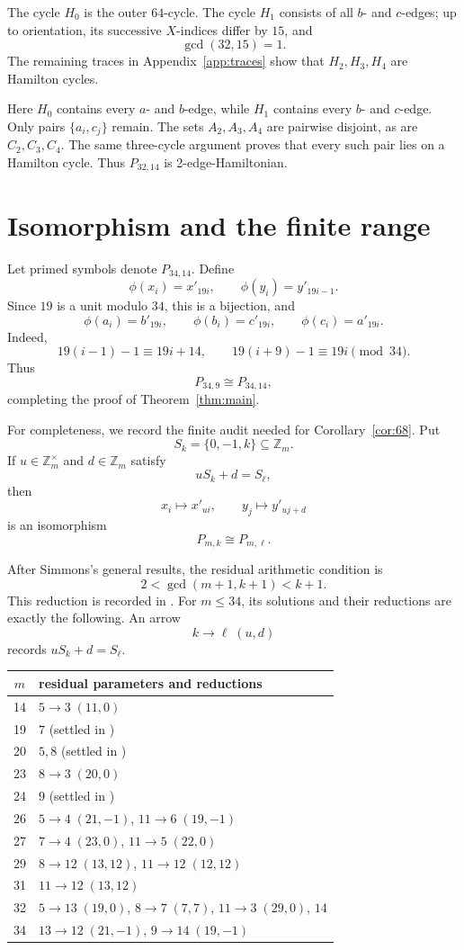 \documentclass[11pt]{amsart}
\newcommand{\Z}{\mathbb Z}
\begin{document}
The cycle $H_0$ is the outer $64$-cycle. The cycle $H_1$ consists of all
$b$- and $c$-edges; up to orientation, its successive $X$-indices differ
by $15$, and
\[
 \gcd(32,15)=1.
\]
The remaining traces in Appendix~\ref{app:traces} show that
$H_2,H_3,H_4$ are Hamilton cycles.

Here $H_0$ contains every $a$- and $b$-edge, while $H_1$ contains every
$b$- and $c$-edge. Only pairs $\{a_i,c_j\}$ remain. The sets
$A_2,A_3,A_4$ are pairwise disjoint, as are $C_2,C_3,C_4$. The same
three-cycle argument proves that every such pair lies on a Hamilton cycle.
Thus $P_{32,14}$ is 2-edge-Hamiltonian.

\section{Isomorphism and the finite range}

Let primed symbols denote $P_{34,14}$. Define
\[
 \phi(x_i)=x'_{19i},
 \qquad
 \phi(y_i)=y'_{19i-1}.
\]
Since $19$ is a unit modulo $34$, this is a bijection, and
\[
 \phi(a_i)=b'_{19i},
 \qquad
 \phi(b_i)=c'_{19i},
 \qquad
 \phi(c_i)=a'_{19i}.
\]
Indeed,
\[
 19(i-1)-1\equiv19i+14,
 \qquad
 19(i+9)-1\equiv19i
 \pmod{34}.
\]
Thus
\[
 P_{34,9}\cong P_{34,14},
\]
completing the proof of Theorem~\ref{thm:main}.

For completeness, we record the finite audit needed for
Corollary~\ref{cor:68}. Put
\[
 S_k=\{0,-1,k\}\subseteq\Z_m.
\]
If $u\in\Z_m^\times$ and $d\in\Z_m$ satisfy
\[
 uS_k+d=S_\ell,
\]
then
\[
 x_i\longmapsto x'_{ui},
 \qquad
 y_j\longmapsto y'_{uj+d}
\]
is an isomorphism
\[
 P_{m,k}\cong P_{m,\ell}.
\]

After Simmons's general results, the residual arithmetic condition is
\[
 2<\gcd(m+1,k+1)<k+1.
\]
This reduction is recorded in \cite{Simmons2020,SimmonsAddendum}.
For $m\le34$, its solutions and their
reductions are exactly the following. An arrow
\[
 k\to\ell\;(u,d)
\]
records $uS_k+d=S_\ell$.

\begin{center}
\small
\begin{tabular}{c|l}
$m$ & residual parameters and reductions \\
\hline
14 & $5\to3\;(11,0)$ \\
19 & $7$ (settled in \cite{Simmons2020}) \\
20 & $5,8$ (settled in \cite{Simmons2020}) \\
23 & $8\to3\;(20,0)$ \\
24 & $9$ (settled in \cite{Simmons2020}) \\
26 & $5\to4\;(21,-1)$, $11\to6\;(19,-1)$ \\
27 & $7\to4\;(23,0)$, $11\to5\;(22,0)$ \\
29 & $8\to12\;(13,12)$, $11\to12\;(12,12)$ \\
31 & $11\to12\;(13,12)$ \\
32 & $5\to13\;(19,0)$, $8\to7\;(7,7)$,
     $11\to3\;(29,0)$, $14$ \\
34 & $13\to12\;(21,-1)$, $9\to14\;(19,-1)$
\end{tabular}
\end{center}
\end{document}
